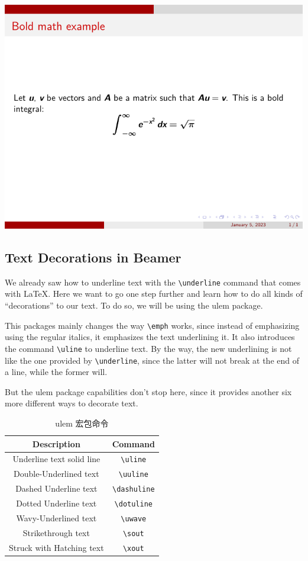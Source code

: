 \includegraphics{examples/beamer/beamertextformat02.pdf}

\subsection{Text Decorations in Beamer}

We already saw how to underline text with the \verb|\underline| command that comes with LaTeX. Here we want to go one step further and learn how to do all kinds of “decorations” to our text. To do so, we will be using the ulem package.

This packages mainly changes the way \verb|\emph| works, since instead of emphasizing using the regular italics, it emphasizes the text underlining it. It also introduces the command \verb|\uline| to underline text. By the way, the new underlining is not like the one provided by \verb|\underline|, since the latter will not break at the end of a line, while the former will.

But the ulem package capabilities don’t stop here, since it provides another six more different ways to decorate text.

\begin{table}[!h]
  \begin{center}
  \caption{ulem 宏包命令}
  \begin{tabular}{cc}
    \toprule
    Description	& Command\\
    \midrule
    Underline text solid line	& \verb|\uline|\\
    Double-Underlined text	& \verb|\uuline|\\
    Dashed Underline text	& \verb|\dashuline|\\
    Dotted Underline text	& \verb|\dotuline|\\
    Wavy-Underlined text	& \verb|\uwave|\\
    Strikethrough text	& \verb|\sout|\\
    Struck with Hatching text	& \verb|\xout|\\
    \bottomrule
  \end{tabular}
  \end{center}
\end{table}

